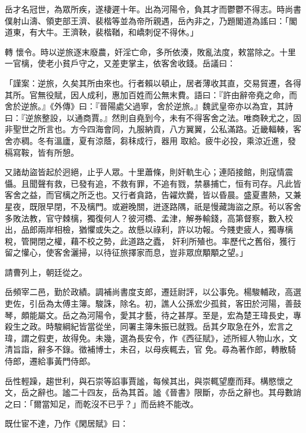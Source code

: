 \begin{pinyinscope}
 岳才名冠世，為眾所疾，遂棲遲十年。出為河陽令，負其才而鬱鬱不得志。時尚書僕射山濤、領吏部王濟、裴楷等並為帝所親遇，岳內非之，乃題閣道為謠曰：「閣道東，有大牛。王濟鞅，裴楷鞧，和嶠刺促不得休。」



 轉
 懷令。時以逆旅逐末廢農，奸淫亡命，多所依湊，敗亂法度，敕當除之。十里一官樆，使老小貧戶守之，又差吏掌主，依客舍收錢。岳議曰：



 「謹案：逆旅，久矣其所由來也。行者賴以頓止，居者薄收其直，交易貿遷，各得其所。官無役賦，因人成利，惠加百姓而公無末費。語曰：『許由辭帝堯之命，而舍於逆旅。』《外傳》曰：『晉陽處父過寧，舍於逆旅。』魏武皇帝亦以為宜，其詩曰：『逆旅整設，以通商賈。』然則自堯到今，未有不得客舍之法。唯商鞅尤之，固非聖世之所言也。方今四海會同，九服納貢，八方翼翼，公私滿路。近畿輻輳，客舍亦稠。冬有溫廬，夏有涼蔭，芻秣成行，器用
 取給。疲牛必投，乘涼近進，發槅寫鞍，皆有所憩。



 又諸劫盜皆起於迥絕，止乎人眾。十里蕭條，則奸軌生心；連陌接館，則寇情震懾。且聞聲有救，已發有追，不救有罪，不追有戮，禁暴捕亡，恒有司存。凡此皆客舍之益，而官樆之所乏也。又行者貪路，告糴炊爨，皆以昏晨。盛夏晝熱，又兼星夜，既限早閉，不及樆門。或避晚關，迸逐路隅，祇是慢藏誨盜之原。茍以客舍多敗法教，官守棘樆，獨復何人？彼河橋、孟津，解券輸錢，高第督察，數入校出，品郎兩岸相檢，猶懼或失之。故懸以祿利，許以功報。今賤吏疲人，獨專樆稅，管開閉之權，藉不校之勢，此道路之蠹，
 奸利所殖也。率歷代之舊俗，獲行留之懽心，使客舍灑掃，以待征旅擇家而息，豈非眾庶顒顒之望。」



 請曹列上，朝廷從之。



 岳頻宰二邑，勤於政績。調補尚書度支郎，遷廷尉評，以公事免。楊駿輔政，高選吏佐，引岳為太傅主簿。駿誅，除名。初，譙人公孫宏少孤貧，客田於河陽，善鼓琴，頗能屬文。岳之為河陽令，愛其才藝，待之甚厚。至是，宏為楚王瑋長史，專殺生之政。時駿綱紀皆當從坐，同署主簿朱振已就戮。岳其夕取急在外，宏言之瑋，謂之假吏，故得免。未幾，選為長安令，作《西征賦》，述所經人物山水，文清旨詣，辭多不錄。徵補博士，未召，以母疾輒去，官
 免。尋為著作郎，轉散騎侍郎，遷給事黃門侍郎。



 岳性輕躁，趨世利，與石崇等諂事賈謐，每候其出，與崇輒望塵而拜。構愍懷之文，岳之辭也。謐二十四友，岳為其首。謐《晉書》限斷，亦岳之辭也。其母數誚之曰：「爾當知足，而乾沒不已乎？」而岳終不能改。



 既仕宦不達，乃作《閑居賦》曰：




\end{pinyinscope}
